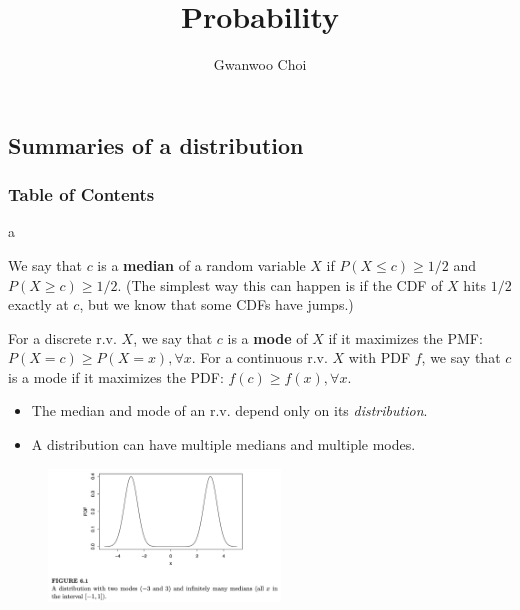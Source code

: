 \documentclass[8pt]{beamer}
\title{Probability}
\author{Gwanwoo Choi}
\newcommand{\tb}[1]{\textbf{#1}}
\newcommand{\ti}[1]{\textit{#1}}
\begin{document}
\begin{frame}
    \titlepage
\end{frame}


\subsection{Summaries of a distribution}

\begin{frame}
    \frametitle{Table of Contents}
    \tableofcontents[currentsubsection]
\end{frame}


\begin{frame}{a}
    \begin{definition}[Median]
        We say that $c$ is a \tb{median} of a random variable $X$ if $P(X\leq c) \geq 1/2$ and $P(X \geq c) \geq 1/2$. (The simplest way this can happen is if the CDF of $X$ hits $1/2$ exactly at $c$, but we know that some CDFs have jumps.)
    \end{definition}

    \begin{definition}[Mode]
        For a discrete r.v. $X$, we say that $c$ is a \tb{mode} of $X$ if it maximizes the PMF: $P(X=c) \geq P(X = x), \forall x$. For a continuous r.v. $X$ with PDF $f$, we say that $c$ is a mode if it maximizes the PDF: $f(c) \geq f(x), \forall x$.
    \end{definition}

    \begin{itemize}
        \item The median and mode of an r.v. depend only on its \ti{distribution}.
        \item A distribution can have multiple medians and multiple modes.
    \end{itemize}

    \begin{figure}
        \centering
        \includegraphics[width=0.55\textwidth]{fig1.png}
    \end{figure}
\end{frame}
\end{document}
